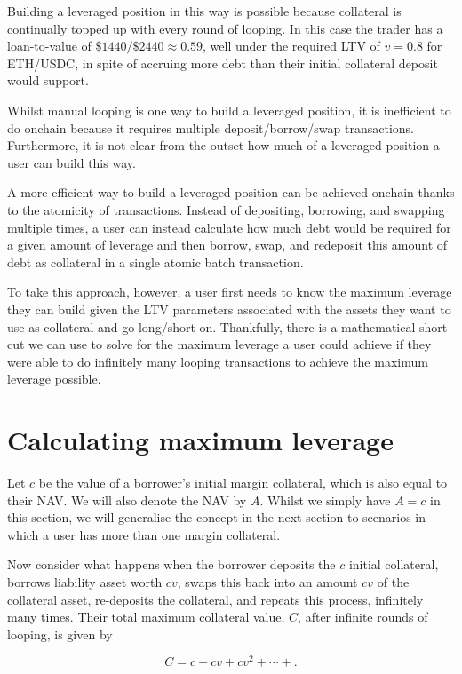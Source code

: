 \documentclass[bibliography=numbered]{article}
\begin{document}
Building a leveraged position in this way is possible because collateral is continually topped up with every round of looping. In this case the trader has a loan-to-value of $\$1440 / \$2440 \approx 0.59$, well under the required LTV of $v = 0.8$ for ETH/USDC, in spite of accruing more debt than their initial collateral deposit would support. 

Whilst manual looping is one way to build a leveraged position, it is inefficient to do onchain because it requires multiple deposit/borrow/swap transactions. Furthermore, it is not clear from the outset how much of a leveraged position a user can build this way. 

A more efficient way to build a leveraged position can be achieved onchain thanks to the atomicity of transactions. Instead of depositing, borrowing, and swapping multiple times, a user can instead calculate how much debt would be required for a given amount of leverage and then borrow, swap, and redeposit this amount of debt as collateral in a single atomic batch transaction.

To take this approach, however, a user first needs to know the maximum leverage they can build given the LTV parameters associated with the assets they want to use as collateral and go long/short on. Thankfully, there is a mathematical short-cut we can use to solve for the maximum leverage a user could achieve if they were able to do infinitely many looping transactions to achieve the maximum leverage possible. 

\section{Calculating maximum leverage}

Let $c$ be the value of a borrower's initial margin collateral, which is also equal to their NAV. We will also denote the NAV by $A$. Whilst we simply have $A = c$ in this section, we will generalise the concept in the next section to scenarios in which a user has more than one margin collateral. 

Now consider what happens when the borrower deposits the $c$ initial collateral, borrows liability asset worth $cv$, swaps this back into an amount $cv$ of the collateral asset, re-deposits the collateral, and repeats this process, infinitely many times. Their total maximum collateral value, $C$, after infinite rounds of looping, is given by 

\begin{equation}
    C
    =
    c
    +
    cv
    +
    cv^2
    +
    \cdots
    +.
\end{equation}
\end{document}
